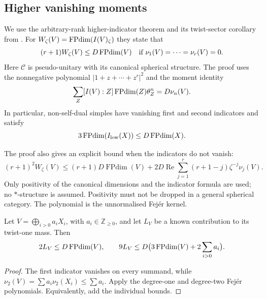 \subsection{Higher vanishing moments}
We use the arbitrary-rank higher-indicator theorem and its twist-sector
corollary from \cite[Theorem~\ref{B-thm:higher-indicator} and
Corollary~\ref{B-cor:higher-sector}]{Finite}. For
$W_\zeta(V)=\operatorname{FPdim}(I(V)_\zeta)$ they state that
\[
 (r+1)W_\zeta(V)\leq D\operatorname{FPdim}(V)
 \quad\text{if }\nu_1(V)=\cdots=\nu_r(V)=0.
\]
Here $\mathcal C$ is pseudo-unitary with its canonical spherical structure.
The proof uses the nonnegative polynomial
$|1+z+\cdots+z^r|^2$ and the moment identity
\begin{equation}\label{eq:indicator-moments}
 \sum_Z[I(V):Z]\operatorname{FPdim}(Z)\theta_Z^n=D\nu_n(V).
\end{equation}
In particular, non-self-dual simples have vanishing first and second
indicators and satisfy
\begin{equation}\label{eq:nonselfdual-third}
 3\operatorname{FPdim}(I_{\rm low}(X))\leq D\operatorname{FPdim}(X).
\end{equation}

\begin{remark}
The proof also gives an explicit bound when the indicators do not vanish:
\[
 (r+1)^2W_\zeta(V)\leq
 (r+1)D\operatorname{FPdim}(V)
 +2D\operatorname{Re}\sum_{j=1}^r(r+1-j)\zeta^{-j}\nu_j(V).
\]
Only positivity of the canonical dimensions and the indicator formula are used;
no $*$-structure is assumed. Positivity must not be dropped in a general spherical
category. The polynomial is the unnormalised Fej\'er kernel.
\end{remark}

\begin{corollary}\label{cor:aggregate}
Let $V=\bigoplus_{i>0}a_iX_i$, with $a_i\in\mathbb Z_{\geq0}$, and let
$L_V$ be a known contribution to its twist-one mass. Then
\[
 2L_V\leq D\operatorname{FPdim}(V),\qquad
 9L_V\leq D\bigl(3\operatorname{FPdim}(V)+2\sum_{i>0}a_i\bigr).
\]
\end{corollary}
\begin{proof}
The first indicator vanishes on every summand, while
$\nu_2(V)=\sum a_i\nu_2(X_i)\leq\sum a_i$. Apply the degree-one and
degree-two Fej\'er polynomials. Equivalently, add the individual bounds.
\end{proof}
